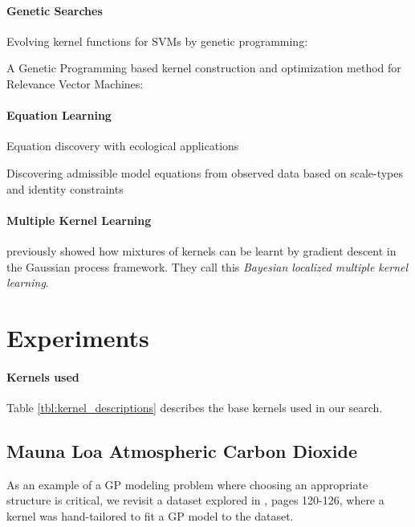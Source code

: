 \documentclass[twoside]{article}
\begin{document}
\paragraph{Genetic Searches}

Evolving kernel functions for SVMs by genetic programming: \cite{diosan2007evolving}

A Genetic Programming based kernel construction and optimization method for Relevance Vector Machines: \cite{bing2010gp}

\paragraph{Equation Learning}

Equation discovery with ecological applications \cite{dzeroski1999equation}

Discovering admissible model equations from observed data based on scale-types and identity constraints \cite{washio1999discovering}

\paragraph{Multiple Kernel Learning}

\cite{christoudias2009bayesian} previously showed how mixtures of kernels can be learnt by gradient descent in the Gaussian process framework.  They call this \emph{Bayesian localized multiple kernel learning}.


\section{Experiments}

\paragraph{Kernels used}
%
Table \ref{tbl:kernel_descriptions} describes the base kernels used in our search.
%



\subsection{Mauna Loa Atmospheric Carbon Dioxide}

As an example of a GP modeling problem where choosing an appropriate structure is critical, we revisit a dataset explored in \cite{rasmussen38gaussian}, pages 120-126, where a kernel was hand-tailored to fit a GP model to the dataset.
\end{document}
